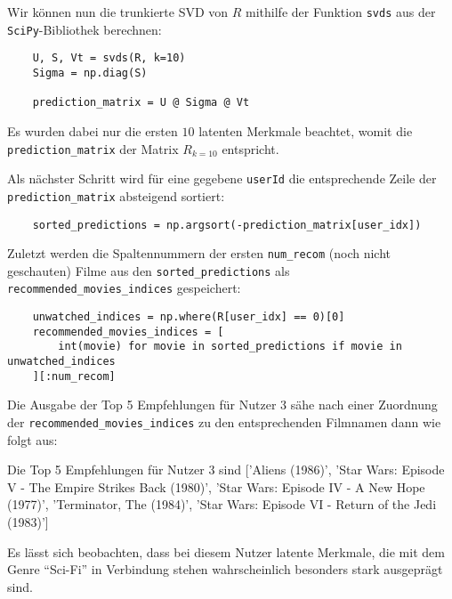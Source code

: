 Wir können nun die trunkierte SVD von \(R\) mithilfe der Funktion \texttt{svds} aus der \texttt{SciPy}-Bibliothek berechnen:
\begin{verbatim}
    U, S, Vt = svds(R, k=10)
    Sigma = np.diag(S)

    prediction_matrix = U @ Sigma @ Vt
\end{verbatim}
Es wurden dabei nur die ersten \(10\) latenten Merkmale beachtet, womit die \texttt{prediction_matrix} der Matrix \(R_{k=10}\) entspricht. 

Als nächster Schritt wird für eine gegebene \texttt{userId} die entsprechende Zeile der \texttt{prediction_matrix} absteigend sortiert:
\begin{verbatim}
    sorted_predictions = np.argsort(-prediction_matrix[user_idx])
\end{verbatim}
Zuletzt werden die Spaltennummern der ersten \texttt{num_recom} (noch nicht geschauten) Filme aus den \texttt{sorted_predictions} als \texttt{recommended_movies_indices} gespeichert:
\begin{verbatim}
    unwatched_indices = np.where(R[user_idx] == 0)[0]
    recommended_movies_indices = [
        int(movie) for movie in sorted_predictions if movie in unwatched_indices
    ][:num_recom]
\end{verbatim}
Die Ausgabe der Top \num{5} Empfehlungen für Nutzer \num{3} sähe nach einer Zuordnung der \texttt{recommended_movies_indices} zu den entsprechenden Filmnamen dann wie folgt aus:
\begin{outputcode}
    Die Top 5 Empfehlungen für Nutzer 3 sind ['Aliens (1986)', 'Star Wars: Episode V - The Empire Strikes Back (1980)', 'Star Wars: Episode IV - A New Hope (1977)', 'Terminator, The (1984)', 'Star Wars: Episode VI - Return of the Jedi (1983)']
\end{outputcode} 
Es lässt sich beobachten, dass bei diesem Nutzer latente Merkmale, die mit dem Genre \enquote{Sci-Fi} in Verbindung stehen wahrscheinlich besonders stark ausgeprägt sind.

